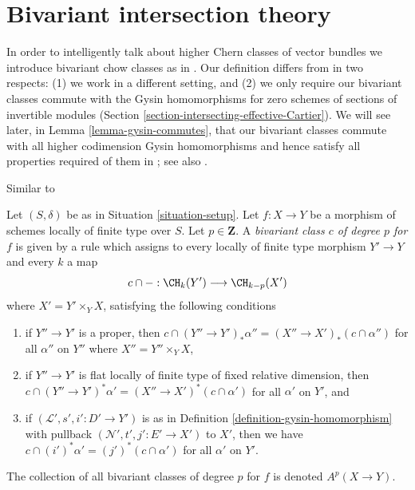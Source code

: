 \section{Bivariant intersection theory}
\label{section-bivariant}

\noindent
In order to intelligently talk about higher Chern classes of vector
bundles we introduce bivariant chow classes as in \cite{F}.
Our definition differs from \cite{F} in two respects:
(1) we work in a different setting, and (2) we only require
our bivariant classes commute with the Gysin homomorphisms for
zero schemes of sections of invertible modules
(Section \ref{section-intersecting-effective-Cartier}).
We will see later, in Lemma \ref{lemma-gysin-commutes}, that our
bivariant classes commute with all higher codimension Gysin homomorphisms
and hence satisfy all properties required of them in \cite{F}; see
also \cite[Theorem 17.1]{F}.

\begin{definition}
\label{definition-bivariant-class}
\begin{reference}
Similar to \cite[Definition 17.1]{F}
\end{reference}
Let $(S, \delta)$ be as in Situation \ref{situation-setup}.
Let $f : X \to Y$ be a morphism of schemes locally of finite type over $S$.
Let $p \in \mathbf{Z}$.
A {\it bivariant class $c$ of degree $p$ for $f$} is given by a rule
which assigns to every locally of finite type morphism $Y' \to Y$
and every $k$ a map
$$
c \cap - : \CH_k(Y') \longrightarrow \CH_{k - p}(X')
$$
where $X' = Y' \times_Y X$, satisfying the following conditions
\begin{enumerate}
\item if $Y'' \to Y'$ is a proper, then
$c \cap (Y'' \to Y')_*\alpha'' = (X'' \to X')_*(c \cap \alpha'')$
for all $\alpha''$ on $Y''$ where $X'' = Y'' \times_Y X$,
\item if $Y'' \to Y'$ is flat locally of finite type of
fixed relative dimension, then
$c \cap (Y'' \to Y')^*\alpha' = (X'' \to X')^*(c \cap \alpha')$
for all $\alpha'$ on $Y'$, and
\item if $(\mathcal{L}', s', i' : D' \to Y')$ is as in
Definition \ref{definition-gysin-homomorphism}
with pullback $(\mathcal{N}', t', j' : E' \to X')$ to $X'$,
then we have $c \cap (i')^*\alpha' = (j')^*(c \cap \alpha')$
for all $\alpha'$ on $Y'$.
\end{enumerate}
The collection of all bivariant classes of degree $p$ for $f$ is
denoted $A^p(X \to Y)$.
\end{definition}

